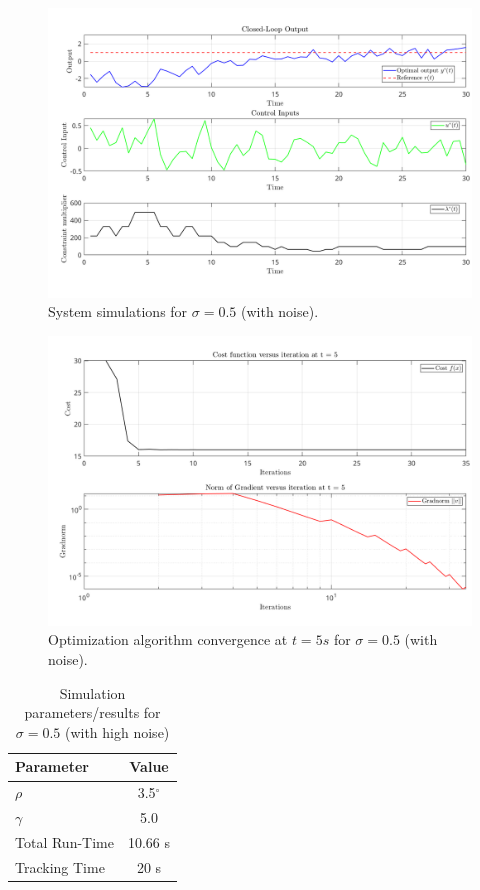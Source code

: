 \begin{figure}[h!]
    \centering
    \includegraphics[width=\textwidth]{figures/closed_loop_snr_0p5_gamma_5_rho_3p5.png}
    \caption{System simulations for $\sigma = 0.5$ (with noise).}
    \label{fig:ddpc_noisy2}
\end{figure}
\begin{figure}[h!]
    \centering
    \includegraphics[width=\textwidth]{figures/cost_gradnorm_snr_0p5_gamma_5_rho_3p5.png}
    \caption{Optimization algorithm convergence at $t=5s$ for $\sigma = 0.5$ (with noise).}
    \label{fig:conv_noisy2}
\end{figure} 

\begin{table}[h]
    \centering
    \begin{tabular}{l|c}
        \textbf{Parameter} & \textbf{Value} \\
        \hline 
        \hline
        $\rho$ & 3.5$^\circ$ \\
        $\gamma$ & 5.0 \\
        Total Run-Time & 10.66 s \\
        Tracking Time & 20 s \\
        \hline
    \end{tabular}
    \caption{Simulation parameters/results for $\sigma=0.5$ (with high noise)}
    \label{tab:ddpc_params_double_integrator_noisy2}
\end{table}

